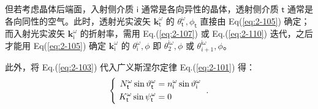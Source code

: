 但若考虑晶体后端面，入射侧介质 $\mathsf{i}$ 通常是各向异性的晶体，透射侧介质 $\mathsf{t}$ 通常是各向同性的空气。此时，透射光实波矢 ${\symbf k}^\omega_{\mathsf{t}}$ 的 $\theta^{\omega}_{\mathsf{t}}, \phi_{\mathsf{t}}$ 直接由 Eq(\ref{eq:2-105}) 确定；而入射光实波矢 ${\symbf k}^\omega_{\mathsf{i}}$ 的折射率，需用 Eq.(\ref{eq:2-107}) 或 Eq.(\ref{eq:2-110}) 迭代，之后才能用 Eq(\ref{eq:2-105}) 确定 ${\symbf k}^\omega_{\mathsf{i}}$ 的 $\theta^{\omega}_{\mathsf{i}}, \phi$ 即 $\theta^{\mathsf{i}\omega}_{2}, \phi$ 或 $\theta^{\mathsf{i}\omega}_{i+1}, \phi$。

此外，将 Eq.(\ref{eq:2-103}) 代入广义斯涅尔定律 Eq.(\ref{eq:2-101}) 得：
\begin{equation} \label{eq:2-111}
	\abovedisplayskip=13pt
	\belowdisplayskip=13pt
	\left\{\ \begin{aligned} N^{\omega}_{\mathsf{t}} \sin \vartheta^{\omega}_{\mathsf{t}} &= n^{\omega}_{\mathsf{i}} \sin \vartheta^{\omega}_{\mathsf{i}} \\ K^{\omega}_{\mathsf{t}} \sin \psi^{\omega}_{\mathsf{t}} &= 0 \end{aligned}\right. ~.
\end{equation}

